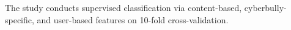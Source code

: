 The study conducts supervised classification via content-based, cyberbully-specific, and user-based features on 10-fold cross-validation.